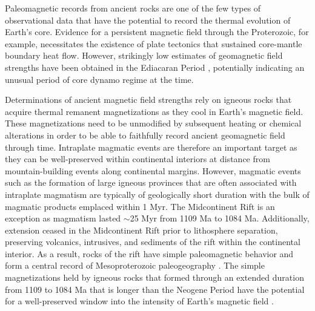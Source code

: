 \documentclass[9pt,twocolumn,twoside,lineno]{pnas-new}
\begin{document}
Paleomagnetic records from ancient rocks are one of the few types of observational data that have the potential to record the thermal evolution of Earth’s core. Evidence for a persistent magnetic field through the Proterozoic, for example, necessitates the existence of plate tectonics that sustained core-mantle boundary heat flow. However, strikingly low estimates of geomagnetic field strengths have been obtained in the Ediacaran Period \cite{Bono2019a, Thallner2021b}, potentially indicating an unusual period of core dynamo regime at the time. 


Determinations of ancient magnetic field strengths rely on igneous rocks that acquire thermal remanent magnetizations as they cool in Earth's magnetic field. These magnetizations need to be unmodified by subsequent heating or chemical alterations in order to be able to faithfully record ancient geomagnetic field through time. Intraplate magmatic events are therefore an important target as they can be well-preserved within continental interiors at distance from mountain-building events along continental margins. However, magmatic events such as the formation of large igneous provinces that are often associated with intraplate magmatism are typically of geologically short duration with the bulk of magmatic products emplaced within 1 Myr. The Midcontinent Rift is an exception as magmatism lasted $\sim$25 Myr from 1109 Ma to 1084 Ma. Additionally, extension ceased in the Midcontinent Rift prior to lithosphere separation, preserving volcanics, intrusives, and sediments of the rift within the continental interior. As a result, rocks of the rift have simple paleomagnetic behavior and form a central record of Mesoproterozoic paleogeography \cite{Swanson-Hysell2021c}. The simple magnetizations held by igneous rocks that formed through an extended duration from 1109 to 1084 Ma that is longer than the Neogene Period have the potential for a well-preserved window into the intensity of Earth's magnetic field . 
\end{document}
